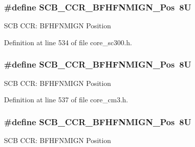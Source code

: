 \subsubsection[{\texorpdfstring{S\+C\+B\+\_\+\+C\+C\+R\+\_\+\+B\+F\+H\+F\+N\+M\+I\+G\+N\+\_\+\+Pos}{SCB_CCR_BFHFNMIGN_Pos}}]{\setlength{\rightskip}{0pt plus 5cm}\#define S\+C\+B\+\_\+\+C\+C\+R\+\_\+\+B\+F\+H\+F\+N\+M\+I\+G\+N\+\_\+\+Pos~8U}\hypertarget{group___c_m_s_i_s___s_c_b_ga4010a4f9e2a745af1b58abe1f791ebbf}{}\label{group___c_m_s_i_s___s_c_b_ga4010a4f9e2a745af1b58abe1f791ebbf}
S\+CB C\+CR\+: B\+F\+H\+F\+N\+M\+I\+GN Position 

Definition at line 534 of file core\+\_\+sc300.\+h.

\subsubsection[{\texorpdfstring{S\+C\+B\+\_\+\+C\+C\+R\+\_\+\+B\+F\+H\+F\+N\+M\+I\+G\+N\+\_\+\+Pos}{SCB_CCR_BFHFNMIGN_Pos}}]{\setlength{\rightskip}{0pt plus 5cm}\#define S\+C\+B\+\_\+\+C\+C\+R\+\_\+\+B\+F\+H\+F\+N\+M\+I\+G\+N\+\_\+\+Pos~8U}\hypertarget{group___c_m_s_i_s___s_c_b_ga4010a4f9e2a745af1b58abe1f791ebbf}{}\label{group___c_m_s_i_s___s_c_b_ga4010a4f9e2a745af1b58abe1f791ebbf}
S\+CB C\+CR\+: B\+F\+H\+F\+N\+M\+I\+GN Position 

Definition at line 537 of file core\+\_\+cm3.\+h.

\subsubsection[{\texorpdfstring{S\+C\+B\+\_\+\+C\+C\+R\+\_\+\+B\+F\+H\+F\+N\+M\+I\+G\+N\+\_\+\+Pos}{SCB_CCR_BFHFNMIGN_Pos}}]{\setlength{\rightskip}{0pt plus 5cm}\#define S\+C\+B\+\_\+\+C\+C\+R\+\_\+\+B\+F\+H\+F\+N\+M\+I\+G\+N\+\_\+\+Pos~8U}\hypertarget{group___c_m_s_i_s___s_c_b_ga4010a4f9e2a745af1b58abe1f791ebbf}{}\label{group___c_m_s_i_s___s_c_b_ga4010a4f9e2a745af1b58abe1f791ebbf}
S\+CB C\+CR\+: B\+F\+H\+F\+N\+M\+I\+GN Position 

